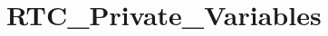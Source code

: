 \hypertarget{group___r_t_c___private___variables}{\section{R\-T\-C\-\_\-\-Private\-\_\-\-Variables}
\label{group___r_t_c___private___variables}
}

